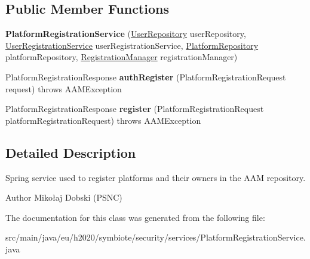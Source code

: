 \subsection*{Public Member Functions}
\begin{DoxyCompactItemize}
\item 
{\bfseries Platform\+Registration\+Service} (\hyperlink{interfaceeu_1_1h2020_1_1symbiote_1_1security_1_1repositories_1_1UserRepository}{User\+Repository} user\+Repository, \hyperlink{classeu_1_1h2020_1_1symbiote_1_1security_1_1services_1_1UserRegistrationService}{User\+Registration\+Service} user\+Registration\+Service, \hyperlink{interfaceeu_1_1h2020_1_1symbiote_1_1security_1_1repositories_1_1PlatformRepository}{Platform\+Repository} platform\+Repository, \hyperlink{classeu_1_1h2020_1_1symbiote_1_1security_1_1commons_1_1RegistrationManager}{Registration\+Manager} registration\+Manager)\hypertarget{classeu_1_1h2020_1_1symbiote_1_1security_1_1services_1_1PlatformRegistrationService_a3ec750fd2f40e2c9ea5b9090826f49d5}{}\label{classeu_1_1h2020_1_1symbiote_1_1security_1_1services_1_1PlatformRegistrationService_a3ec750fd2f40e2c9ea5b9090826f49d5}

\item 
Platform\+Registration\+Response {\bfseries auth\+Register} (Platform\+Registration\+Request request)  throws A\+A\+M\+Exception \hypertarget{classeu_1_1h2020_1_1symbiote_1_1security_1_1services_1_1PlatformRegistrationService_a1ff8016dbe7d30d98cfd965b7abc044f}{}\label{classeu_1_1h2020_1_1symbiote_1_1security_1_1services_1_1PlatformRegistrationService_a1ff8016dbe7d30d98cfd965b7abc044f}

\item 
Platform\+Registration\+Response {\bfseries register} (Platform\+Registration\+Request platform\+Registration\+Request)  throws A\+A\+M\+Exception \hypertarget{classeu_1_1h2020_1_1symbiote_1_1security_1_1services_1_1PlatformRegistrationService_a07e05bad6ada1c9e1152dd61de6c5f50}{}\label{classeu_1_1h2020_1_1symbiote_1_1security_1_1services_1_1PlatformRegistrationService_a07e05bad6ada1c9e1152dd61de6c5f50}

\end{DoxyCompactItemize}


\subsection{Detailed Description}
Spring service used to register platforms and their owners in the A\+AM repository.

\begin{DoxyAuthor}{Author}
Mikołaj Dobski (P\+S\+NC) 
\end{DoxyAuthor}


The documentation for this class was generated from the following file\+:\begin{DoxyCompactItemize}
\item 
src/main/java/eu/h2020/symbiote/security/services/Platform\+Registration\+Service.\+java\end{DoxyCompactItemize}
